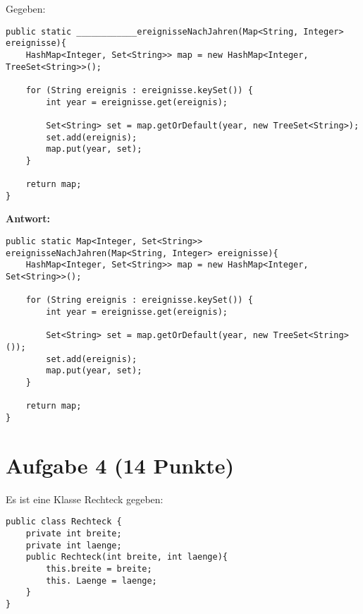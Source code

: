 Gegeben:
\begin{lstlisting}
public static ____________ereignisseNachJahren(Map<String, Integer> ereignisse){
    HashMap<Integer, Set<String>> map = new HashMap<Integer, TreeSet<String>>();

    for (String ereignis : ereignisse.keySet()) {
        int year = ereignisse.get(ereignis);

        Set<String> set = map.getOrDefault(year, new TreeSet<String>);
        set.add(ereignis);
        map.put(year, set);
    }

    return map;
}
\end{lstlisting}

\textbf{Antwort:}

\begin{lstlisting}
public static Map<Integer, Set<String>> ereignisseNachJahren(Map<String, Integer> ereignisse){
    HashMap<Integer, Set<String>> map = new HashMap<Integer, Set<String>>();

    for (String ereignis : ereignisse.keySet()) {
        int year = ereignisse.get(ereignis);

        Set<String> set = map.getOrDefault(year, new TreeSet<String>());
        set.add(ereignis);
        map.put(year, set);
    }

    return map;
}
\end{lstlisting}

\section{Aufgabe 4 (14 Punkte)}

Es ist eine Klasse Rechteck gegeben:

\begin{lstlisting}
public class Rechteck {
    private int breite;
    private int laenge;
    public Rechteck(int breite, int laenge){
        this.breite = breite;
        this. Laenge = laenge;
    }
}
\end{lstlisting}

